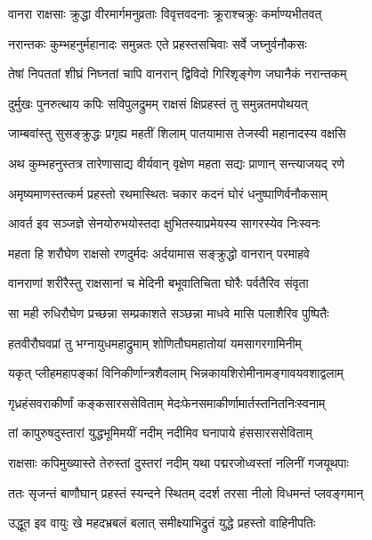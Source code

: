 \twolineshloka
{वानरा राक्षसाः क्रुद्धा वीरमार्गमनुव्रताः}
{विवृत्तवदनाः क्रूराश्चक्रुः कर्माण्यभीतवत्} %

\twolineshloka
{नरान्तकः कुम्भहनुर्महानादः समुन्नतः}
{एते प्रहस्तसचिवाः सर्वे जघ्नुर्वनौकसः} %

\twolineshloka
{तेषां निपततां शीघ्रं निघ्नतां चापि वानरान्}
{द्विविदो गिरिशृङ्गेण जघानैकं नरान्तकम्} %

\twolineshloka
{दुर्मुखः पुनरुत्थाय कपिः सविपुलद्रुमम्}
{राक्षसं क्षिप्रहस्तं तु समुन्नतमपोथयत्} %

\twolineshloka
{जाम्बवांस्तु सुसङ्क्रुद्धः प्रगृह्य महतीं शिलाम्}
{पातयामास तेजस्वी महानादस्य वक्षसि} %

\twolineshloka
{अथ कुम्भहनुस्तत्र तारेणासाद्य वीर्यवान्}
{वृक्षेण महता सद्यः प्राणान् सन्त्याजयद् रणे} %

\twolineshloka
{अमृष्यमाणस्तत्कर्म प्रहस्तो रथमास्थितः}
{चकार कदनं घोरं धनुष्पाणिर्वनौकसाम्} %

\twolineshloka
{आवर्त इव सञ्जज्ञे सेनयोरुभयोस्तदा}
{क्षुभितस्याप्रमेयस्य सागरस्येव निःस्वनः} %

\twolineshloka
{महता हि शरौघेण राक्षसो रणदुर्मदः}
{अर्दयामास सङ्क्रुद्धो वानरान् परमाहवे} %

\twolineshloka
{वानराणां शरीरैस्तु राक्षसानां च मेदिनी}
{बभूवातिचिता घोरैः पर्वतैरिव संवृता} %

\twolineshloka
{सा मही रुधिरौघेण प्रच्छन्ना सम्प्रकाशते}
{सञ्छन्ना माधवे मासि पलाशैरिव पुष्पितैः} %

\twolineshloka
{हतवीरौघवप्रां तु भग्नायुधमहाद्रुमाम्}
{शोणितौघमहातोयां यमसागरगामिनीम्} %

\twolineshloka
{यकृत् प्लीहमहापङ्कां विनिकीर्णान्त्रशैवलाम्}
{भिन्नकायशिरोमीनामङ्गावयवशाद्वलाम्} %

\twolineshloka
{गृध्रहंसवराकीर्णां कङ्कसारससेविताम्}
{मेदःफेनसमाकीर्णामार्तस्तनितनिःस्वनाम्} %

\twolineshloka
{तां कापुरुषदुस्तारां युद्धभूमिमयीं नदीम्}
{नदीमिव घनापाये हंससारससेविताम्} %

\twolineshloka
{राक्षसाः कपिमुख्यास्ते तेरुस्तां दुस्तरां नदीम्}
{यथा पद्मरजोध्वस्तां नलिनीं गजयूथपाः} %

\twolineshloka
{ततः सृजन्तं बाणौघान् प्रहस्तं स्यन्दने स्थितम्}
{ददर्श तरसा नीलो विधमन्तं प्लवङ्गमान्} %

\twolineshloka
{उद्धूत इव वायुः खे महदभ्रबलं बलात्}
{समीक्ष्याभिद्रुतं युद्धे प्रहस्तो वाहिनीपतिः} %

